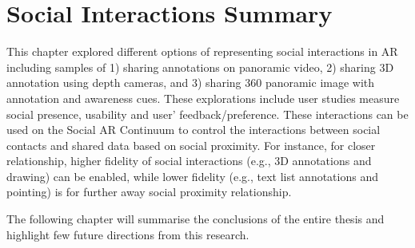 \section{Social Interactions Summary}

This chapter explored different options of representing social interactions in AR including samples of 1) sharing annotations on panoramic video, 2) sharing 3D annotation using depth cameras, and 3) sharing 360 panoramic image with annotation and awareness cues. These explorations include user studies measure social presence, usability and user' feedback/preference. These interactions can be used on the Social AR Continuum to control the interactions between social contacts and shared data based on social proximity. For instance, for closer relationship, higher fidelity of social interactions (e.g., 3D annotations and drawing) can be enabled, while lower fidelity (e.g., text list annotations and pointing) is for further away social proximity relationship.

The following chapter will summarise the conclusions of the entire thesis and highlight few future directions from this research.
